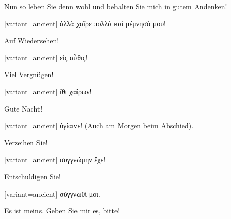 Nun so leben Sie denn wohl und behalten Sie mich in gutem Andenken!

\switchcolumn

\begin{greek}[variant=ancient]%
ἀλλὰ χαῖρε πολλὰ καὶ μέμνησό μου!

\end{greek}%
\switchcolumn*

Auf Wiedersehen!

\switchcolumn

\begin{greek}[variant=ancient]%
εἰς αὖθις!

\end{greek}%
\switchcolumn*

Viel Vergnügen!

\switchcolumn

\begin{greek}[variant=ancient]%
ἴθι χαίρων!

\end{greek}%
\switchcolumn*

Gute Nacht!

\switchcolumn

\begin{greek}[variant=ancient]%
ὑγίαινε!\textgerman[spelling=old,babelshorthands=true]{ (Auch am Morgen
beim Abschied).}

\end{greek}%
\indent Verzeihen Sie!

\switchcolumn

\begin{greek}[variant=ancient]%
συγγνώμην ἔχε!

\end{greek}%
\switchcolumn*

Ent\textcompwordmark{}schuldigen Sie!

\switchcolumn

\begin{greek}[variant=ancient]%
σύγγνωθί μοι.

\end{greek}%
\switchcolumn*

Es ist meins. Geben Sie mir es, bitte!

\switchcolumn

